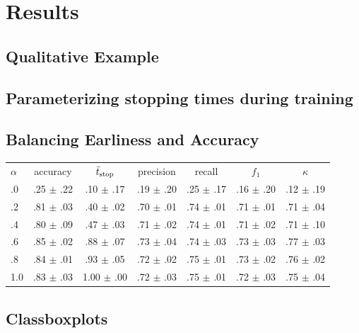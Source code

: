 \documentclass[a0]{tumposter}
\begin{document}
\begin{minipage}[t]{.32\textwidth}
	\section{Results}
	
	
	\figearlyreward

	\subsection{Qualitative Example}
	
	
	
	\subsection{Parameterizing stopping times during training}
	
	
	
	
	\subsection{Balancing Earliness and Accuracy}
	\begin{table}
		
		\scriptsize
		\hspace{0em}\begin{tabular}{lcccccc}
			\toprule\small
			\textbf{$\alpha$} & accuracy & $\bar{t}_\text{stop}$  & precision & recall & $f_1$ & $\kappa$ \\
			\cmidrule(lr){0-0}\cmidrule(lr){1-1}\cmidrule(lr){2-2}\cmidrule(lr){3-3}\cmidrule(lr){4-4}\cmidrule(lr){5-5}\cmidrule(lr){6-6}\cmidrule(lr){7-7}
			.0 & .25 $\pm$ .22 & .10 $\pm$ .17 & .19 $\pm$ .20 & .25 $\pm$ .17 & .16 $\pm$ .20 & .12 $\pm$ .19 \\
			.2 & .81 $\pm$ .03 & .40 $\pm$ .02 & .70 $\pm$ .01 & .74 $\pm$ .01 & .71 $\pm$ .01 & .71 $\pm$ .04 \\
			.4 & .80 $\pm$ .09 & .47 $\pm$ .03 & .71 $\pm$ .02 & .74 $\pm$ .01 & .71 $\pm$ .02 & .71 $\pm$ .10 \\
			.6 & .85 $\pm$ .02 & .88 $\pm$ .07 & .73 $\pm$ .04 & .74 $\pm$ .03 & .73 $\pm$ .03 & .77 $\pm$ .03 \\
			.8 & .84 $\pm$ .01 & .93 $\pm$ .05 & .72 $\pm$ .02 & .75 $\pm$ .01 & .73 $\pm$ .02 & .76 $\pm$ .02 \\
			1.0 & .83 $\pm$ .03 & 1.00 $\pm$ .00 & .72 $\pm$ .03 & .75 $\pm$ .01 & .72 $\pm$ .03 & .75 $\pm$ .04 \\
			\bottomrule
		\end{tabular}
		
	\end{table}
	
	\subsection{Classboxplots}
	
	
	
\end{minipage}
\end{document}
